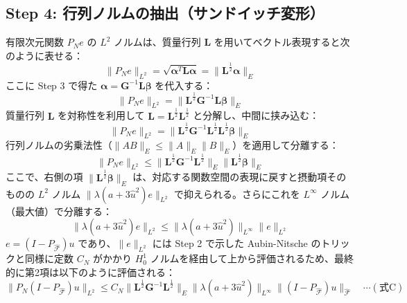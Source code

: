 \documentclass[a4paper, 11pt]{ltjsreport}
\theoremstyle{plain}
\theoremstyle{definition}
\begin{document}
\subsection*{Step 4: 行列ノルムの抽出（サンドイッチ変形）}
有限次元関数 $P_N e$ の $L^2$ ノルムは、質量行列 $\mathbf{L}$ を用いてベクトル表現すると次のように表せる：
\begin{equation}
\|P_N e\|_{L^2} = \sqrt{\mathbf{\alpha}^T \mathbf{L} \mathbf{\alpha}} = \|\mathbf{L}^{\frac{1}{2}} \mathbf{\alpha}\|_E
\end{equation}
ここに Step 3 で得た $\mathbf{\alpha} = \mathbf{G}^{-1} \mathbf{L} \mathbf{\beta}$ を代入する：
\begin{equation}
\|P_N e\|_{L^2} = \|\mathbf{L}^{\frac{1}{2}} \mathbf{G}^{-1} \mathbf{L} \mathbf{\beta}\|_E
\end{equation}
質量行列 $\mathbf{L}$ を対称性を利用して $\mathbf{L} = \mathbf{L}^{\frac{1}{2}} \mathbf{L}^{\frac{1}{2}}$ と分解し、中間に挟み込む：
\begin{equation}
\|P_N e\|_{L^2} = \|\mathbf{L}^{\frac{1}{2}} \mathbf{G}^{-1} \mathbf{L}^{\frac{1}{2}} \mathbf{L}^{\frac{1}{2}} \mathbf{\beta}\|_E
\end{equation}
行列ノルムの劣乗法性（$\|AB\|_E \le \|A\|_E \|B\|_E$）を適用して分離する：
\begin{equation}
\|P_N e\|_{L^2} \le \|\mathbf{L}^{\frac{1}{2}} \mathbf{G}^{-1} \mathbf{L}^{\frac{1}{2}}\|_E \|\mathbf{L}^{\frac{1}{2}} \mathbf{\beta}\|_E
\end{equation}
ここで、右側の項 $\|\mathbf{L}^{\frac{1}{2}} \mathbf{\beta}\|_E$ は、対応する関数空間の表現に戻すと摂動項そのものの $L^2$ ノルム $\|\lambda(a+3\hat{u}^2)e\|_{L^2}$ で抑えられる。さらにこれを $L^\infty$ ノルム（最大値）で分離する：
\begin{equation}
\|\lambda(a+3\hat{u}^2)e\|_{L^2} \le \|\lambda(a+3\hat{u}^2)\|_{L^\infty} \|e\|_{L^2}
\end{equation}
$e = (I - P_{\hat{\mathcal{F}}})u$ であり、$\|e\|_{L^2}$ には Step 2 で示した Aubin-Nitsche のトリックと同様に定数 $C_N$ がかかり $H_0^1$ ノルムを経由して上から評価されるため、最終的に第2項は以下のように評価される：
\begin{equation}
\|P_N(I - P_{\hat{\mathcal{F}}})u\|_{L^2} \le C_N \|\mathbf{L}^{\frac{1}{2}} \mathbf{G}^{-1} \mathbf{L}^{\frac{1}{2}}\|_E \|\lambda(a+3\hat{u}^2)\|_{L^\infty} \|(I - P_{\hat{\mathcal{F}}})u\|_{\hat{\mathcal{F}}} \quad \cdots (\text{式C})
\end{equation}
\end{document}

